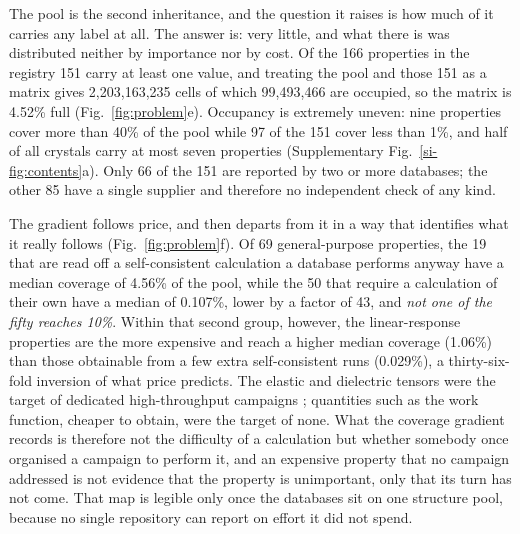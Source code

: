 The pool is the second inheritance, and the question it raises is how much of it
carries any label at all. The answer is: very little, and what there is was
distributed neither by importance nor by cost. Of the 166 properties in the
registry 151 carry at least one value, and treating the pool and those 151 as a
matrix gives 2{,}203{,}163{,}235 cells of which 99{,}493{,}466 are occupied, so
the matrix is 4.52\% full (Fig.~\ref{fig:problem}e). Occupancy is extremely
uneven: nine properties cover more than 40\% of the pool while 97 of the 151
cover less than 1\%, and half of all crystals carry at most seven properties
(Supplementary Fig.~\ref{si-fig:contents}a). Only 66 of the 151 are reported by two or more
databases; the other 85 have a single supplier and therefore no independent check
of any kind.

The gradient follows price, and then departs from it in a way that identifies
what it really follows (Fig.~\ref{fig:problem}f). Of 69 general-purpose
properties, the 19 that are read off a self-consistent calculation a database
performs anyway have a median coverage of 4.56\% of the pool, while the 50 that
require a calculation of their own have a median of 0.107\%, lower by a factor of
43, and \emph{not one of the fifty reaches 10\%}. Within that second group,
however, the linear-response properties are the more expensive and reach a higher
median coverage (1.06\%) than those obtainable from a few extra self-consistent
runs (0.029\%), a thirty-six-fold inversion of what price predicts. The elastic
and dielectric tensors were the target of dedicated high-throughput campaigns
\cite{dejong2015charting,petousis2017high}; quantities such as the work function,
cheaper to obtain, were the target of none. What the coverage gradient records is
therefore not the difficulty of a calculation but whether somebody once organised
a campaign to perform it, and an expensive property that no campaign addressed is
not evidence that the property is unimportant, only that its turn has not come.
That map is legible only once the databases sit on one structure pool, because no
single repository can report on effort it did not spend.

